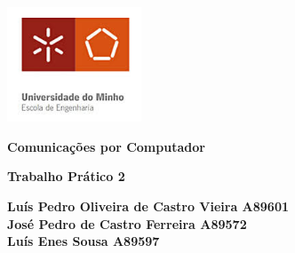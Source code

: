 \documentclass[11pt]{article}
\begin{document}
\begin{titlepage}
    \begin{center}
        \includegraphics[width=0.3\textwidth]{images/capa/EscolaEngenhariaUM.jpeg}
    
        \vspace{1cm}
        
        \textbf{\LARGE Comunicações por Computador}
    
        \vspace{0.5cm}
        \textbf{\Large Trabalho Prático 2}

        \vspace{1.3cm}
        
        \textbf{\large Luís Pedro Oliveira de Castro Vieira A89601 \\
        José Pedro de Castro Ferreira A89572 \\
        Luís Enes Sousa A89597}


\end{center}
\end{titlepage}
\end{document}
